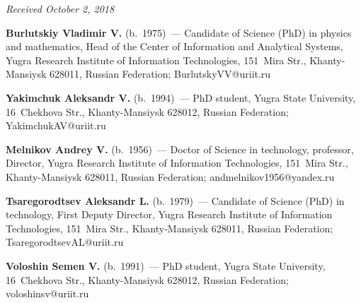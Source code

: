 
\hfill{\small\textit{Received October 2, 2018}}


  
  
  \Contr
  
  
  \noindent
  \textbf{Burlutskiy Vladimir V.} (b.\ 1975)~--- Candidate of Science (PhD) in 
physics and mathematics, Head of the Center of Information and Analytical Systems, 
Yugra Research Institute of Information Technologies, 151~Mira Str.,  
Khanty-Mansiysk 628011, Russian Federation; \mbox{BurlutskyVV@uriit.ru}
  
  \vspace*{3pt}
  
  \noindent
  \textbf{Yakimchuk Aleksandr V.} (b.\ 1994)~--- PhD student, Yugra State 
University, 16~Chekhova Str., Khanty-Mansiysk 628012, Russian Federation; 
\mbox{YakimchukAV@uriit.ru }
  
  \vspace*{3pt}
  
  \noindent
  \textbf{Melnikov Andrey V.} (b.\ 1956)~--- Doctor of Science in technology, 
professor, Director, Yugra Research Institute of Information Technologies, 151~Mira 
Str., Khanty-Mansiysk 628011, Russian Federation; 
\mbox{andmelnikov1956@yandex.ru} 
  
  \vspace*{3pt}
  
  \noindent
  \textbf{Tsaregorodtsev Aleksandr L.} (b.\ 1979)~--- Candidate of Science (PhD) 
in technology, First Deputy Director, Yugra Research Institute of Information 
Technologies, 151~Mira Str., Khanty-Mansiysk 628011, Russian Federation; 
\mbox{TsaregorodtsevAL@uriit.ru} 
  
  
  \vspace*{3pt}
  
  \noindent
  \textbf{Voloshin Semen V.} (b.\ 1991)~--- PhD student, Yugra State University, 
16~Chekhova Str., Khanty-Mansiysk 628012, Russian Federation; 
\mbox{voloshinsv@uriit.ru}
  
       
   
   
   
\label{end\stat}

\renewcommand{\bibname}{\protect\rm Литература}  